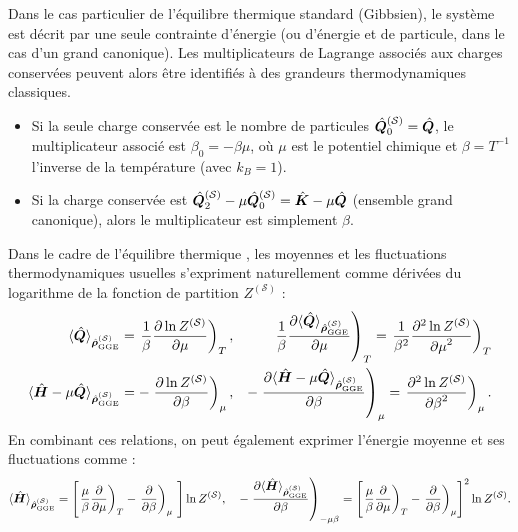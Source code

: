 Dans le cas particulier de l’équilibre thermique standard (\ie Gibbsien), le système est décrit par une seule contrainte d’énergie (ou d’énergie et de particule, dans le cas d’un grand canonique). Les multiplicateurs de Lagrange associés aux charges conservées peuvent alors être identifiés à des grandeurs thermodynamiques classiques.

\begin{itemize}[label=$\bullet$]
	\item Si la seule charge conservée est le nombre de particules $\hat{\bm{Q}}_0^{(\mathcal{S})} = \hat{\bm{Q}}$, le multiplicateur associé est $\beta_0 = -\beta \mu$, où $\mu$ est le potentiel chimique et $\beta = T^{-1}$ l’inverse de la température (avec $k_B = 1$).
	
	\item Si la charge conservée est $\hat{\bm{Q}}_2^{(\mathcal{S})}-\mu\hat{\bm{Q}}_0^{(\mathcal{S})}  = \hat{\bm{K}} - \mu \hat{\bm{Q}} $ (ensemble grand canonique), alors le multiplicateur est simplement $ \beta$.
\end{itemize}

Dans le cadre de l’équilibre thermique , les moyennes et les fluctuations thermodynamiques usuelles s’expriment naturellement comme dérivées du logarithme de la fonction de partition $Z^{(\mathcal{S})}$ :
\begin{eqnarray}
	\langle \hat{\bm{Q}} \rangle_{\hat{\bm{\rho}}^{(\mathcal{S})}_{\mathrm{GGE}}}  = \left .\frac{1}{\beta} \frac{ \partial \ln Z^{(\mathcal{S})}}{\partial \mu } \right )_{T},  & &  \left . \frac{1}{\beta} \frac{ \partial \langle \hat{\bm{Q}} \rangle_{\hat{\bm{\rho}}^{(\mathcal{S})}_{\mathrm{GGE}}}}{\partial \mu } \right )_{T} =  \left . \frac{1}{\beta^2} \frac{ \partial^2 \ln Z^{(\mathcal{S})}}{{\partial \mu}^2 } \right )_{T} \\
	\langle \hat{\bm{H}} - \mu\hat{\bm{Q}}  \rangle_{\hat{\bm{\rho}}^{(\mathcal{S})}_{\mathrm{GGE}}}  = -\left . \frac{ \partial \ln Z^{(\mathcal{S})}}{\partial \beta } \right )_{\mu} ,  & & -\left .  \frac{ \partial \langle \hat{\bm{H}} - \mu\hat{\bm{Q}} \rangle_{\hat{\bm{\rho}}^{(\mathcal{S})}_{\mathrm{GGE}}}}{\partial \beta } \right )_{\mu } = \left .  \frac{ \partial^2 \ln Z^{(\mathcal{S})}}{{\partial \beta}^2 } \right )_{\mu}   .		
\end{eqnarray}
En combinant ces relations, on peut également exprimer l’énergie moyenne et ses fluctuations comme :
\begin{eqnarray}
	\langle \operator{H} \rangle_{\operator{\rho}^{(\mathcal{S})}_{\mathrm{GGE}}}  = \left [ \left .\frac{\mu}{\beta} \frac{ \partial}{\partial \mu } \right )_{T} -\left . \frac{ \partial }{\partial \beta } \right )_{\mu}   \right ]\ln Z^{(\mathcal{S})},  \quad  -\left .  \frac{ \partial \langle \operator{H} \rangle_{\operator{\rho}^{(\mathcal{S})}_{\mathrm{GGE}}}}{\partial \beta } \right )_{-\mu \beta } = \left [ \left .\frac{\mu}{\beta} \frac{ \partial}{\partial \mu } \right )_{T} -\left . \frac{ \partial }{\partial \beta } \right )_{\mu}  \right ]^2\ln Z^{(\mathcal{S})}.		
\end{eqnarray}

